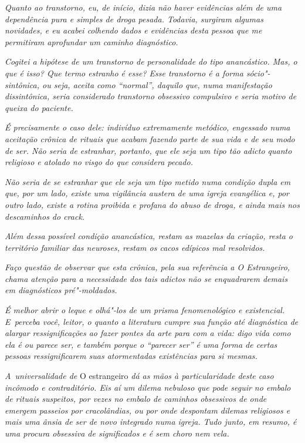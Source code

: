 \emph{Quanto ao transtorno, eu, de início, dizia não haver evidências
além de uma dependência pura e simples de droga pesada. Todavia,
surgiram algumas novidades, e eu acabei colhendo dados e evidências
desta pessoa que me permitiram aprofundar um caminho diagnóstico.}~

\emph{Cogitei a hipótese de um transtorno de personalidade do tipo
anancástico. Mas, o que é isso? Que termo estranho é esse? Esse
transtorno é a forma sócio"-sintônica, ou seja, aceita como ``normal'',
daquilo que, numa manifestação dissintônica, seria considerado
transtorno obsessivo compulsivo e seria motivo de queixa do paciente.}~

\emph{É precisamente o caso dele: indivíduo extremamente metódico,
engessado numa aceitação crônica de rituais que acabam fazendo parte de
sua vida e de seu modo de ser. Não seria de estranhar, portanto, que ele
seja um tipo tão adicto quanto religioso e atolado no visgo do que
considera pecado.}

\emph{Não seria de se estranhar que ele seja um tipo metido numa
condição dupla em que, por um lado, existe uma vigilância austera de uma
igreja evangélica e, por outro lado, existe a rotina proibida e profana
do abuso de droga, e ainda mais nos descaminhos do crack.}~

\emph{Além dessa possível condição anancástica, restam as mazelas da
criação, resta o território familiar das neuroses, restam os cacos
edípicos mal resolvidos.}~

\emph{Faço questão de observar que esta crônica, pela sua referência a O
Estrangeiro, chama atenção para a necessidade dos tais adictos não se
enquadrarem demais em diagnósticos pré"-moldados.}~

\emph{É melhor abrir o leque e olhá"-los de um prisma fenomenológico e
existencial. E~perceba você, leitor, o quanto a literatura cumpre sua
função até diagnóstica de alargar ressignificações ao fazer pontes da
arte para com a vida: digo vida como ela é ou parece ser, e também
porque o ``parecer ser'' é uma forma de certas pessoas ressignificarem
suas atormentadas existências para si mesmas.}~

\emph{A~universalidade de} O estrangeiro \emph{dá as mãos à particularidade
deste caso incômodo e contraditório. Eis aí um dilema nebuloso que pode
seguir no embalo de rituais suspeitos, por vezes no embalo de caminhos
obsessivos de onde emergem passeios por cracolândias, ou por onde
despontam dilemas religiosos e mais uma ânsia de ser de novo integrado
numa igreja. Tudo junto, em resumo, é uma procura obsessiva de
significados e é sem choro nem vela.~}
